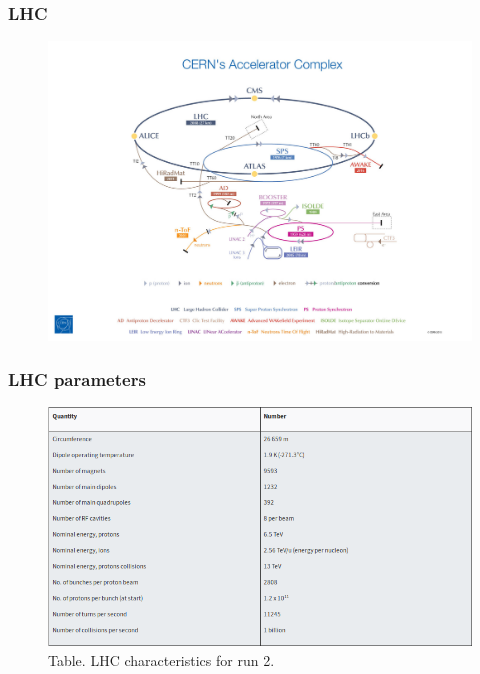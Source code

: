 \documentclass[11pt]{beamer}
\begin{document}
\begin{frame}
\frametitle{LHC}
\begin{center}
	\begin{figure}
	\includegraphics[scale=0.25]{figures/CERN's-accelerator-complex2013.jpg}
	\end{figure}
\end{center}
\end{frame}



\begin{frame}
\frametitle{LHC parameters}
\begin{center}
	\begin{figure}
		\includegraphics[scale=0.5]{figures/lhc-t.png}
		\caption*{Table. LHC characteristics for run 2.}
	\end{figure}
\end{center}
\end{frame}
\end{document}

